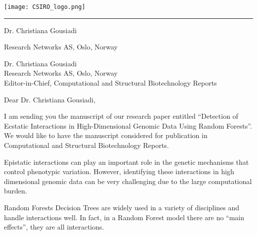 \documentclass{article}
\begin{document}
\vspace*{\dimexpr-\headsep-\headheight-1pt}

\noindent
\begin{minipage}[t]{0.5\textwidth}
  \texttt{[image: CSIRO\_logo.png]}
\end{minipage}%
\begin{minipage}[t]{0.5\textwidth}
  \raggedleft
\end{minipage}

\rule{\linewidth}{1pt}

\bigskip\bigskip

Dr. Christiana Gousiadi

Research Networks AS, Oslo, Norway

\noindent
\begin{minipage}[t]{\textwidth}
  Dr. Christiana Gousiadi \\ 
  Research Networks AS, Oslo, Norway \\
  Editor-in-Chief,  Computational and Structural Biotechnology Reports \\ 
\end{minipage}

\bigskip\bigskip

\noindent
Dear Dr. Christiana Gousiadi,

\bigskip


I am sending you the manuscript of our research paper entitled ``Detection of Ecstatic Interactions in High-Dimensional
Genomic Data Using Random Forests''. We would like to have the manuscript considered for publication in  Computational and Structural Biotechnology Reports.

Epistatic interactions can play an important role in the genetic mechanisms that control phenotypic variation. However,
identifying these interactions in high dimensional genomic data can be very challenging due to the large computational
burden.

Random Forests Decision Trees are widely used in a variety of disciplines and handle interactions well.
In fact, in a Random Forest model there are no ``main effects'', they are all interactions. 
\end{document}
